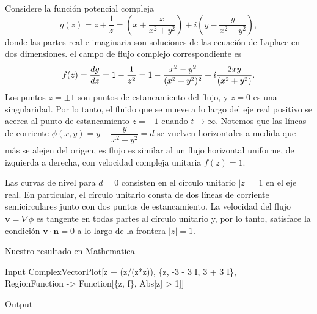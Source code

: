 \begin{Ejem}
	Considere la función potencial compleja
	$$g(z)=z+\dfrac{1}{z}=\left(x+\dfrac{x}{x^2+y^2}\right)+i\left(y-\dfrac{y}{x^2+y^2}\right),$$
	donde las partes real e imaginaria son soluciones de las ecuación de Laplace en dos dimensiones.  el  campo de flujo complejo correspondiente es 
	$$f(z)=\dfrac{dg}{dz}=1-\dfrac{1}{z^2}=1-\dfrac{x^2-y^2}{(x^2+y^2)^2}+i\dfrac{2xy}{(x^2+y^2)}.$$
	Los puntos $z=\pm 1$ son puntos de estancamiento del flujo, y $z=0$ es una singularidad. Por lo tanto, el fluido que se mueve a lo largo del eje real positivo  se acerca al punto de estancamiento $z=-1$ cuando $t\rightarrow \infty$. Notemos que las líneas de corriente $\phi(x,y)=y-\dfrac{y}{x^2+y^2}=d$ se vuelven horizontales a medida que más se alejen del origen, es flujo es similar al un flujo horizontal uniforme, de izquierda a derecha, con velocidad compleja unitaria $f(z)=1$.
	
	Las curvas de nivel para $d = 0$ consisten en el círculo unitario $|z| = 1$ en el eje real. En particular, el círculo unitario consta de dos líneas de corriente semicirculares junto con dos puntos de estancamiento.
	La velocidad del flujo $\textbf{v} = \nabla\phi$ es tangente en todas partes al círculo unitario y, por lo tanto, satisface la condición $\mathbf{v}\cdot\mathbf{n}=0$ a lo largo de la frontera $|z|=1$.
	  
	Nuestro resultado en Mathematica 
	\begin{mmaCell}{Input}
		ComplexVectorPlot[z + (z/(z*z)), \{z, -3 - 3 I, 3 + 3 I\}, \\RegionFunction -> Function[\{z, f\}, Abs[z] > 1]]
	\end{mmaCell}
	\begin{mmaCell}[moregraphics={moreig={scale=0.3}}]{Output}
	\end{mmaCell}
\end{Ejem}


